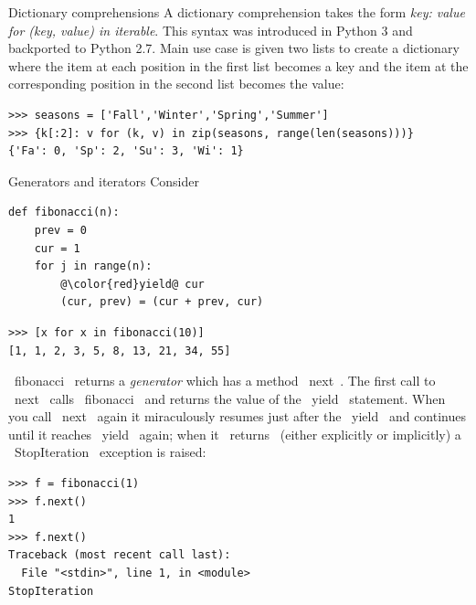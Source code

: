\documentclass[10pt, t]{beamer}
\let\verb=\codeDelimTwiddles
\begin{document}
%FIXME
\begin{frame}[fragile,label=sec-2-16]{Dictionary comprehensions}
 \lstset{language=Python,label= ,caption= ,numbers=none}
A dictionary comprehension takes the form \emph{{key: value for (key, value) in iterable}}. 
This syntax was introduced in Python 3 and backported to Python 2.7. 
Main use case is given two lists to create a dictionary where the item at each position in the first list becomes a key and the item at the corresponding position in the second list becomes the value:
\begin{lstlisting}
>>> seasons = ['Fall','Winter','Spring','Summer']
>>> {k[:2]: v for (k, v) in zip(seasons, range(len(seasons)))}
{'Fa': 0, 'Sp': 2, 'Su': 3, 'Wi': 1}
\end{lstlisting}
\end{frame}

\begin{frame}[fragile,label=sec-2-17]{Generators and iterators}
 Consider
\lstset{language=Python,label= ,caption= ,numbers=none}
\begin{lstlisting}
def fibonacci(n):
    prev = 0
    cur = 1
    for j in range(n):
        @\color{red}yield@ cur
        (cur, prev) = (cur + prev, cur)
\end{lstlisting}
\pause
\lstset{language=Python,label= ,caption= ,numbers=none}
\begin{lstlisting}
>>> [x for x in fibonacci(10)]
[1, 1, 2, 3, 5, 8, 13, 21, 34, 55]
\end{lstlisting}

\pause

\verb~fibonacci~ returns a \emph{generator} which has a method \verb~next~. The first call to \verb~next~ calls \verb~fibonacci~ and returns
the value of the \verb~yield~ statement.  When you call \verb~next~ again it miraculously resumes just after the \verb~yield~
and continues until it reaches \verb~yield~ again; when it \verb~returns~ (either explicitly or implicitly) a
\verb~StopIteration~ exception is raised:

\pause
\lstset{language=Python,label= ,caption= ,numbers=none}
\begin{lstlisting}
>>> f = fibonacci(1)
>>> f.next()
1
>>> f.next()
Traceback (most recent call last):
  File "<stdin>", line 1, in <module>
StopIteration
\end{lstlisting}
\end{frame}
\end{document}
